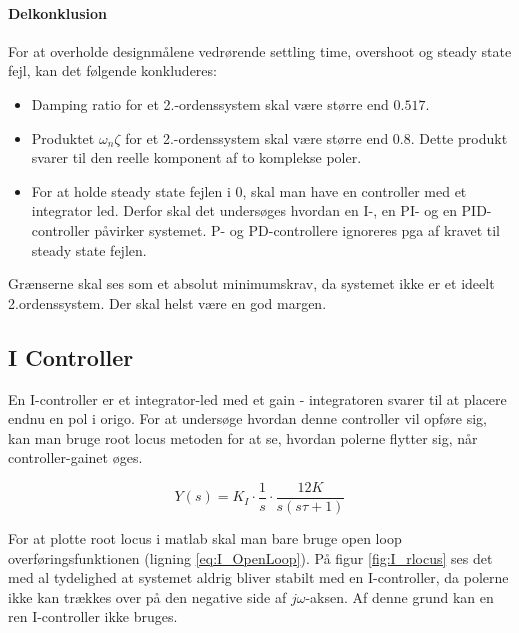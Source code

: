 \paragraph{Delkonklusion}

For at overholde designmålene vedrørende settling time, overshoot og steady state fejl, kan det følgende konkluderes:

\begin{itemize}
\item Damping ratio for et 2.-ordenssystem skal være større end $0.517$.
\item Produktet $\omega_{n}\zeta$ for et 2.-ordenssystem skal være større end $0.8$. Dette produkt svarer til den reelle komponent af to komplekse poler.
\item For at holde steady state fejlen i 0, skal man have en controller med et integrator led. Derfor skal det undersøges hvordan en I-, en PI- og en PID-controller påvirker systemet. P- og PD-controllere ignoreres pga af kravet til steady state fejlen.
\end{itemize}

Grænserne skal ses som et absolut minimumskrav, da systemet ikke er et ideelt 2.ordenssystem. Der skal helst være en god margen.

\subsection{I Controller}

En I-controller er et integrator-led med et gain - integratoren svarer til at placere endnu en pol i origo. For at undersøge hvordan denne controller vil opføre sig, kan man bruge root locus metoden for at se, hvordan polerne flytter sig, når controller-gainet øges. 

\begin{equation}\label{eq:I_OpenLoop}
Y(s)=K_{I}\cdot\frac{1}{s}\cdot\frac{12K}{s(s\tau+1)}
\end{equation}

For at plotte root locus i matlab skal man bare bruge open loop overføringsfunktionen (ligning \ref{eq:I_OpenLoop}). På figur \ref{fig:I_rlocus} ses det med al tydelighed at systemet aldrig bliver stabilt med en I-controller, da polerne ikke kan trækkes over på den negative side af $j\omega$-aksen. Af denne grund kan en ren I-controller ikke bruges.

